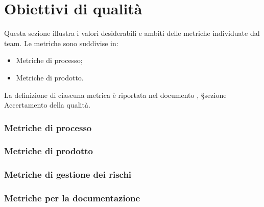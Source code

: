 \section{Obiettivi di qualità}

\par Questa sezione illustra i valori desiderabili e ambiti delle metriche individuate dal team. Le metriche sono suddivise in:
\begin{itemize}
  \item Metriche di processo;
  \item Metriche di prodotto.
\end{itemize}

\par La definizione di ciascuna metrica è riportata nel documento \NormeDiProgetto, §sezione Accertamento della qualità.

\subsubsection{Metriche di processo}


\subsubsection{Metriche di prodotto}





\subsubsection{Metriche di gestione dei rischi}


\subsubsection{Metriche per la documentazione}

